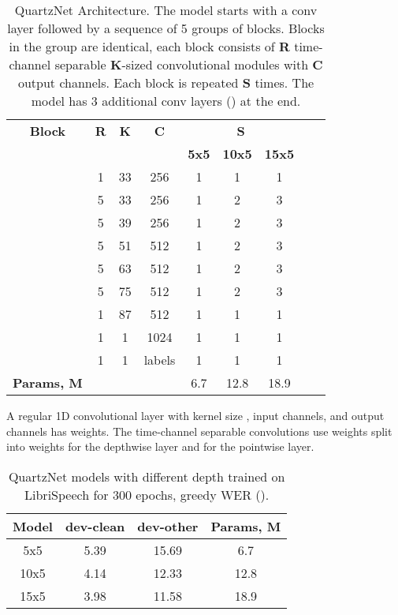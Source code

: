 \documentclass{article}
\begin{document}
\begin{table}[t]
\caption{
QuartzNet Architecture. The model starts with a conv layer  followed by a sequence of 5 groups of blocks. Blocks in the group are identical, each block  consists of \textbf{R} time-channel separable \textbf{K}-sized convolutional modules with \textbf{C} output channels. Each block is repeated \textbf{S} times. The model has 3 additional conv layers () at the end.
}
\vspace{4pt}
\label{tab:Model_Architectures}
\centering
\scalebox{1.0}
{
\begin{tabular}{c c c c c c c c c}
 \hline
   \textbf{Block} & \textbf{R} & \textbf{K} & \textbf{C}& \multicolumn{3}{c}{\textbf{S}} \\
 & & & & \textbf{5x5} & \textbf{10x5} & \textbf{15x5} \\
 \hline
  & 1 & 33 & 256 & 1 & 1 & 1\\
 \hline
  & 5 & 33 & 256 & 1 & 2 & 3\\
  & 5 & 39 & 256 & 1 & 2 & 3\\
  & 5 & 51 & 512 & 1 & 2 & 3\\
  & 5 & 63 & 512 & 1 & 2 & 3\\
  & 5 & 75 & 512 & 1 & 2 & 3\\
 \hline
  & 1 & 87 & 512 & 1 & 1 & 1\\
  & 1 & 1 & 1024 & 1 & 1 & 1\\
  & 1 & 1 & labels   & 1 & 1 & 1\\
 \hline
 \textbf{Params, M}& & & & 6.7 & 12.8 & 18.9\\
 \hline
\end{tabular}
}
\end{table}

A regular 1D convolutional layer with kernel size ,  input channels, and  output channels has  weights. The time-channel separable convolutions use  weights split into  weights for the depthwise layer and  for the pointwise layer.

\begin{table}[th]
\centering
\caption{QuartzNet models with different depth trained on LibriSpeech for 300 epochs, greedy WER ().}
\vspace{4pt}
\label{tab:Depth}
\scalebox{1.0}
{
\begin{tabular}{c c c c} 
 \hline
 {\textbf{Model}} & {\textbf{dev-clean}} & {\textbf{dev-other}} & {\textbf{Params, M}} \\
 \hline
 5x5 & 5.39 & 15.69 & 6.7\\ 
 10x5 & 4.14 & 12.33 &  12.8 \\ 
 15x5  & 3.98 & 11.58 & 18.9\\ 
 \hline
\end{tabular}
}
\end{table}
\end{document}
